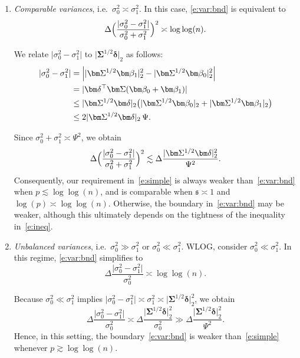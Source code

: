 \documentclass[11pt, a4paper]{article}
\theoremstyle{definition}
\theoremstyle{definition}
\theoremstyle{definition}
\theoremstyle{definition}
\theoremstyle{definition}
\theoremstyle{remark}
\theoremstyle{definition}
\theoremstyle{definition}
\theoremstyle{definition}
\begin{document}
\begin{enumerate}[label=(\alph*)]
\item\label{i:same:var} \emph{Comparable variances}, i.e.\ $\sigma_0^2 \asymp \sigma_1^2$.  
In this case, \eqref{e:var:bnd} is equivalent to
\[
\Delta
\Bigl(\frac{\lvert \sigma_0^2 - \sigma_1^2\rvert}{\sigma_0^2 + \sigma_1^2}\Bigr)^2
\asymp \log\log(n).
\]

We relate $\lvert \sigma_0^2 - \sigma_1^2\rvert$ to $\lvert \bm\Sigma^{1/2}\bm\delta\rvert_2$ as follows:
\begin{align}
\lvert \sigma_0^2 - \sigma_1^2\rvert
&=
\Bigl\lvert
\lvert \bm\Sigma^{1/2}\bm\beta_1\rvert_2^2
-
\lvert \bm\Sigma^{1/2}\bm\beta_0\rvert_2^2
\Bigr\rvert \notag \\
&=
\lvert \bm\delta^\top \bm\Sigma (\bm\beta_0 + \bm\beta_1)\rvert \notag \\
&\le
\lvert \bm\Sigma^{1/2}\bm\delta\rvert_2
\bigl(
\lvert \bm\Sigma^{1/2}\bm\beta_0\rvert_2
+
\lvert \bm\Sigma^{1/2}\bm\beta_1\rvert_2
\bigr)
\label{e:ineq} \\
&\le
2 \lvert \bm\Sigma^{1/2}\bm\delta\rvert_2 \, \Psi. \notag
\end{align}

Since $\sigma_0^2 + \sigma_1^2 \asymp \Psi^2$, we obtain
\[
\Delta
\Bigl(\frac{\lvert \sigma_0^2 - \sigma_1^2\rvert}{\sigma_0^2 + \sigma_1^2}\Bigr)^2
\lesssim
\Delta \frac{\lvert \bm\Sigma^{1/2}\bm\delta\rvert_2^2}{\Psi^2}.
\]
Consequently, our requirement in~\eqref{e:simple} is always weaker than~\eqref{e:var:bnd} when
$p \lesssim \log\log(n)$, and is comparable when $\mathfrak{s} \asymp 1$ and $\log(p) \asymp \log\log(n)$. Otherwise, the boundary in~\eqref{e:var:bnd} may be weaker, although this ultimately depends on the tightness of the inequality in~\eqref{e:ineq}.

\item \emph{Unbalanced variances}, i.e.\ $\sigma_0^2 \gg \sigma_1^2$ or $\sigma_0^2 \ll \sigma_1^2$.  
WLOG, consider $\sigma_0^2 \ll \sigma_1^2$. In this regime, \eqref{e:var:bnd} simplifies to
\[
\Delta \frac{\lvert \sigma_0^2 - \sigma_1^2\rvert}{\sigma_0^2}
\asymp \log\log(n).
\]

Because $\sigma_0^2 \ll \sigma_1^2$ implies
$\lvert \sigma_0^2 - \sigma_1^2\rvert \asymp \sigma_1^2
\asymp \lvert \bm\Sigma^{1/2}\bm\delta\rvert_2^2$,
we obtain
\[
\Delta \frac{\lvert \sigma_0^2 - \sigma_1^2\rvert}{\sigma_0^2}
\asymp
\Delta \frac{\lvert \bm\Sigma^{1/2}\bm\delta\rvert_2^2}{\sigma_0^2}
\gg
\Delta \frac{\lvert \bm\Sigma^{1/2}\bm\delta\rvert_2^2}{\Psi^2}.
\]
Hence, in this setting, the boundary~\eqref{e:var:bnd} is weaker than~\eqref{e:simple} whenever
$p \gtrsim \log\log(n)$.
\end{enumerate}
\end{document}

